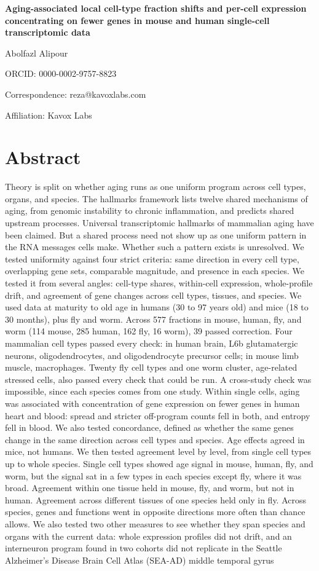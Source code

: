 \documentclass[11pt]{article}
\begin{document}
{\Large\bfseries Aging-associated local cell-type fraction shifts and per-cell expression concentrating on fewer genes in mouse and human single-cell transcriptomic data\par}\vspace{12pt}

Abolfazl Alipour

ORCID: 0000-0002-9757-8823

Correspondence: reza@kavoxlabs.com

Affiliation: Kavox Labs


\section*{Abstract}

Theory is split on whether aging runs as one uniform program across cell types, organs, and species. The hallmarks framework lists twelve shared mechanisms of aging, from genomic instability to chronic inflammation, and predicts shared upstream processes. Universal transcriptomic hallmarks of mammalian aging have been claimed. But a shared process need not show up as one uniform pattern in the RNA messages cells make. Whether such a pattern exists is unresolved. We tested uniformity against four strict criteria: same direction in every cell type, overlapping gene sets, comparable magnitude, and presence in each species. We tested it from several angles: cell-type shares, within-cell expression, whole-profile drift, and agreement of gene changes across cell types, tissues, and species. We used data at maturity to old age in humans (30 to 97 years old) and mice (18 to 30 months), plus fly and worm. Across 577 fractions in mouse, human, fly, and worm (114 mouse, 285 human, 162 fly, 16 worm), 39 passed correction. Four mammalian cell types passed every check: in human brain, L6b glutamatergic neurons, oligodendrocytes, and oligodendrocyte precursor cells; in mouse limb muscle, macrophages. Twenty fly cell types and one worm cluster, age-related stressed cells, also passed every check that could be run. A cross-study check was impossible, since each species comes from one study. Within single cells, aging was associated with concentration of gene expression on fewer genes in human heart and blood: spread and stricter off-program counts fell in both, and entropy fell in blood. We also tested concordance, defined as whether the same genes change in the same direction across cell types and species. Age effects agreed in mice, not humans. We then tested agreement level by level, from single cell types up to whole species. Single cell types showed age signal in mouse, human, fly, and worm, but the signal sat in a few types in each species except fly, where it was broad. Agreement within one tissue held in mouse, fly, and worm, but not in human. Agreement across different tissues of one species held only in fly. Across species, genes and functions went in opposite directions more often than chance allows. We also tested two other measures to see whether they span species and organs with the current data: whole expression profiles did not drift, and an interneuron program found in two cohorts did not replicate in the Seattle Alzheimer's Disease Brain Cell Atlas (SEA-AD) middle temporal gyrus 
\end{document}
